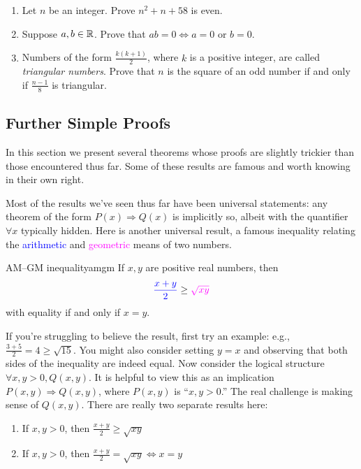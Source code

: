 \begin{exercises}{}{}
\begin{enumerate}
    
    \item Let $n$ be an integer. Prove $n^2+n+58$ is even. 

  
		\item\label{exs:zerofactor} Suppose $a,b\in\mathbb{R}$. Prove that $ab=0\iff a=0$ or $b=0$.
  
    
    \item Numbers of the form $\frac{k(k + 1)}{2}$, where $k$ is a positive integer, are called \emph{triangular numbers}. Prove that $n$ is the square of an odd number if and only if $\frac{n-1}{8}$ is triangular.
         
	\end{enumerate}
\end{exercises}

\clearpage



\subsection{Further Simple Proofs}\label{sec:proof2}



In this section we present several theorems whose proofs are slightly trickier than those encountered thus far. Some of these results are famous and worth knowing in their own right.



Most of the results we've seen thus far have been universal statements: any theorem of the form $P(x)\Longrightarrow Q(x)$ is implicitly so, albeit with the quantifier $\forall x$ typically hidden. Here is another universal result, a famous inequality relating the \textcolor{blue}{arithmetic} and \textcolor{Magenta}{geometric} means of two numbers.

\begin{thm}{AM--GM inequality}{amgm}
	If $x,y$ are positive real numbers, then
	\[
		\textcolor{blue}{\frac{x+y}{2}}\ge\textcolor{Magenta}{\sqrt{xy}}
	\]
	with equality if and only if $x=y$.
\end{thm}

If you're struggling to believe the result, first try an example: e.g., $\frac{3+5}2=4\ge \sqrt{15}$. You might also consider setting $y=x$ and observing that both sides of the inequality are indeed equal. Now consider the logical structure $\forall x,y>0, Q(x,y)$. It is helpful to view this as an implication $P(x,y)\Longrightarrow Q(x,y)$, where $P(x,y)$ is ``$x,y>0$.'' The real challenge is making sense of $Q(x,y)$. There are really two separate results here:
\begin{enumerate}
  \item If $x,y> 0$, then $\frac{x+y}{2}\ge\sqrt{xy}$
  \item If $x,y> 0$, then $\frac{x+y}{2}=\sqrt{xy}\iff x=y$
\end{enumerate}

